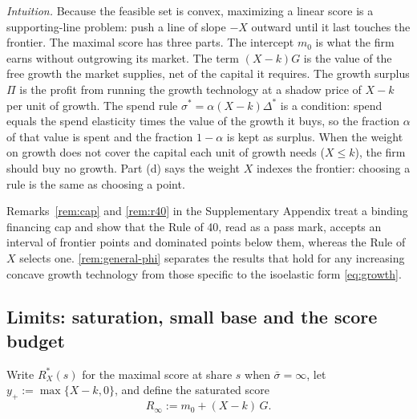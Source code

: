 \noindent\emph{Intuition.} Because the feasible set is convex, maximizing a linear score is a supporting-line problem: push a line of slope $-X$ outward until it last touches the frontier. The maximal score has three parts. The intercept $m_0$ is what the firm earns without outgrowing its market. The term $(X-k)G$ is the value of the free growth the market supplies, net of the capital it requires. The growth surplus $\Pi$ is the profit from running the growth technology at a shadow price of $X-k$ per unit of growth. The spend rule $\sigma^*=\alpha(X-k)\Delta^*$ is a \citet{dorfman1954optimal} condition: spend equals the spend elasticity times the value of the growth it buys, so the fraction $\alpha$ of that value is spent and the fraction $1-\alpha$ is kept as surplus. When the weight on growth does not cover the capital each unit of growth needs ($X\le k$), the firm should buy no growth. Part (d) says the weight $X$ indexes the frontier: choosing a rule is the same as choosing a point.

Remarks~\ref{rem:cap} and \ref{rem:r40} in the Supplementary Appendix treat a binding financing cap and show that the Rule of 40, read as a pass mark, accepts an interval of frontier points and dominated points below them, whereas the Rule of $X$ selects one. \autoref{rem:general-phi} separates the results that hold for any increasing concave growth technology from those specific to the isoelastic form \eqref{eq:growth}.

\subsection{Limits: saturation, small base and the score budget}\label{sec:model-limits}

Write $R_X^*(s)$ for the maximal score at share $s$ when $\bar\sigma=\infty$, let $y_+:=\max\{X-k,0\}$, and define the saturated score
\begin{equation}\label{eq:Rinf}
R_\infty:=m_0+(X-k)\,G .
\end{equation}

